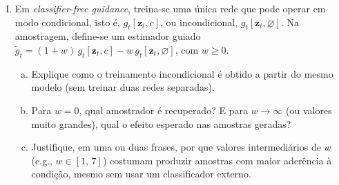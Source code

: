\documentclass{dlproblemset}
\begin{document}
\begin{enumerate}[I)]
\item {} Em \textit{classifier-free guidance}, treina-se uma única rede que pode operar em modo condicional, isto é, $g_t[\mathbf{z}_t, c]$, ou incondicional, $g_t[\mathbf{z}_t, \varnothing]$. Na amostragem, define-se um estimador guiado $\tilde{g}_t = (1 + w)\, g_t[\mathbf{z}_t, c] - w\, g_t[\mathbf{z}_t, \varnothing]$, com $w \geq 0$.
\begin{enumerate}[(a)]
    \item Explique como o treinamento incondicional é obtido a partir do mesmo modelo (sem treinar duas redes separadas).
    \item Para $w = 0$, qual amostrador é recuperado? E para $w \to \infty$ (ou valores muito grandes), qual o efeito esperado nas amostras geradas?
    \item Justifique, em uma ou duas frases, por que valores intermediários de $w$ (e.g., $w \in [1,\,7]$) costumam produzir amostras com maior aderência à condição, mesmo sem usar um classificador externo.
\end{enumerate}



\end{enumerate}
\end{document}
